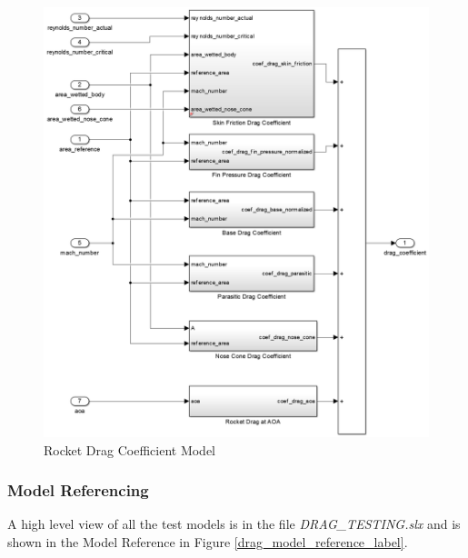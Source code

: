 \documentclass[]{article}
\begin{document}
\begin{figure}[htbp]
\centering
\includegraphics{images/rocket_drag_coefficient.png}
\caption{Rocket Drag Coefficient Model
\label{rocket_drag_coefficients_label}}
\end{figure}

\clearpage

\subsubsection{Model Referencing}\label{model-referencing-1}

A high level view of all the test models is in the file
\emph{DRAG\_TESTING.slx} and is shown in the Model Reference in Figure
\ref{drag_model_reference_label}.
\end{document}
